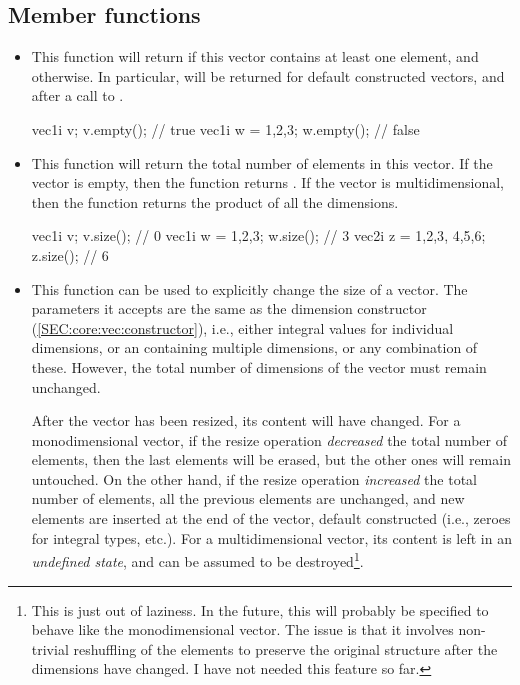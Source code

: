 \documentclass[12pt]{report}
\newenvironment{example}
{
    \begin{mdframed}[style=example,frametitle={Example}]
}
{
    \end{mdframed}
}
\newcommand{\cpptrue}{\cppinline{true}\xspace}
\newcommand{\cppfalse}{\cppinline{false}\xspace}
\begin{document}
\subsection{Member functions \label{SEC:core:vec:member_fun}}

\begin{itemize}
\item {}

This function will return \cpptrue if this vector contains at least one element, and \cppfalse otherwise. In particular, \cpptrue will be returned for default constructed vectors, and after a call to .

\begin{example}
\begin{cppcode}
vec1i v;
v.empty(); // true
vec1i w = {1,2,3};
w.empty(); // false
\end{cppcode}
\end{example}

\item {}

This function will return the total number of elements in this vector. If the vector is empty, then the function returns . If the vector is multidimensional, then the function returns the product of all the dimensions.

\begin{example}
\begin{cppcode}
vec1i v;
v.size(); // 0
vec1i w = {1,2,3};
w.size(); // 3
vec2i z = {{1,2,3}, {4,5,6}};
z.size(); // 6
\end{cppcode}
\end{example}

\item {}

This function can be used to explicitly change the size of a vector. The parameters it accepts are the same as the dimension constructor (\ref{SEC:core:vec:constructor}), i.e., either integral values for individual dimensions, or an  containing multiple dimensions, or any combination of these. However, the total number of dimensions of the vector must remain unchanged.

After the vector has been resized, its content will have changed. For a monodimensional vector, if the resize operation \emph{decreased} the total number of elements, then the last elements will be erased, but the other ones will remain untouched. On the other hand, if the resize operation \emph{increased} the total number of elements, all the previous elements are unchanged, and new elements are inserted at the end of the vector, default constructed (i.e., zeroes for integral types, etc.). For a multidimensional vector, its content is left in an \emph{undefined state}, and can be assumed to be destroyed\footnote{This is just out of laziness. In the future, this will probably be specified to behave like the monodimensional vector. The issue is that it involves non-trivial reshuffling of the elements to preserve the original structure after the dimensions have changed. I have not needed this feature so far.}.


\end{itemize}
\end{document}
